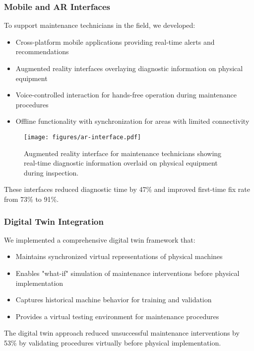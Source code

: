 \subsubsection{Mobile and AR Interfaces}
To support maintenance technicians in the field, we developed:
\begin{itemize}
    \item Cross-platform mobile applications providing real-time alerts and recommendations
    \item Augmented reality interfaces overlaying diagnostic information on physical equipment
    \item Voice-controlled interaction for hands-free operation during maintenance procedures
    \item Offline functionality with synchronization for areas with limited connectivity
\end{itemize}

\begin{figure}[t]
\centering
\texttt{[image: figures/ar-interface.pdf]}
\caption{Augmented reality interface for maintenance technicians showing real-time diagnostic information overlaid on physical equipment during inspection.}
\label{fig:ar_interface}
\end{figure}

These interfaces reduced diagnostic time by 47\% and improved first-time fix rate from 73\% to 91\%.

\subsubsection{Digital Twin Integration}
We implemented a comprehensive digital twin framework that:
\begin{itemize}
    \item Maintains synchronized virtual representations of physical machines
    \item Enables "what-if" simulation of maintenance interventions before physical implementation
    \item Captures historical machine behavior for training and validation
    \item Provides a virtual testing environment for maintenance procedures
\end{itemize}

The digital twin approach reduced unsuccessful maintenance interventions by 53\% by validating procedures virtually before physical implementation.